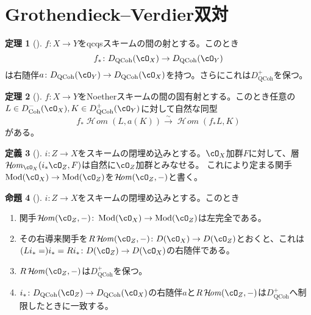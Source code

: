 \documentclass[uplatex, a4paper, dvipdfmx]{jsarticle}
\theoremstyle{definition}
\newtheorem{theorem}{定理}[section]
\newtheorem{definition}[theorem]{定義}
\newtheorem{proposition}[theorem]{命題}
\DeclareMathOperator{\CHom}{\mathcal{H}\!\mathit{om}}
\DeclareMathOperator{\Coh}{\mathrm{Coh}}
\DeclareMathOperator{\QCoh}{\mathrm{QCoh}}
\DeclareMathOperator{\Mod}{\mathrm{Mod}}
\begin{document}
\section{Grothendieck--Verdier双対}
\begin{theorem}[{\cite[\href{https://stacks.math.columbia.edu/tag/0A9E}{Tag 0A9E}]{stacks-project}}]
    $f \colon X \to Y$をqcqsスキームの間の射とする。このとき
    \begin{equation}
        f_* \colon D_{\QCoh}(\cO_X) \to D_{\QCoh}(\cO_Y)
    \end{equation}
    は右随伴$a \colon D_{\QCoh}(\cO_Y) \to D_{\QCoh}(\cO_X)$を持つ。さらにこれは$D_{\QCoh}^+$を保つ。
\end{theorem}
\begin{theorem}[{\cite[\href{https://stacks.math.columbia.edu/tag/0GEW}{Tag 0GEW}]{stacks-project}}]\label{thm:Grothendieck-Verdier-duality-for-complexes}
    $f \colon X \to Y$をNoetherスキームの間の固有射とする。このとき任意の$L \in D_{\Coh}^-(\cO_X), K \in D_{\QCoh}^+(\cO_Y)$に対して自然な同型
    \begin{equation}
        f_* \CHom(L, a(K)) \xrightarrow{\sim} \CHom(f_*L, K)
    \end{equation}
    がある。
\end{theorem}
\begin{definition}[{\cite[\href{https://stacks.math.columbia.edu/tag/0A74}{Tag 0A74}]{stacks-project}}]
    $i \colon Z \to X$をスキームの閉埋め込みとする。$\cO_X$加群$F$に対して、層$\CHom_{\cO_X}(i_*\cO_Z, F)$は自然に$\cO_Z$加群とみなせる。
    これにより定まる関手$\Mod(\cO_X) \to \Mod(\cO_Z)$を$\CHom(\cO_Z, -)$と書く。
\end{definition}
\begin{proposition}[{\cite[\href{https://stacks.math.columbia.edu/tag/0A74}{Tag 0A74}]{stacks-project}}]\label{prop:Grothendieck-Verdier-duality-for-closed-immersion}
    $i \colon Z \to X$をスキームの閉埋め込みとする。このとき
    \begin{enumerate}
        \item 関手$\CHom(\cO_Z, -) \colon \Mod(\cO_X) \to \Mod(\cO_Z)$は左完全である。
        \item その右導来関手を$R\CHom(\cO_Z, -) \colon D(\cO_X) \to D(\cO_Z)$とおくと、これは$(L i_* = )i_* = R i_* \colon D(\cO_Z) \to D(\cO_X)$の右随伴である。
        \item $R\CHom(\cO_Z, -)$は$D_{\QCoh}^+$を保つ。
        \item $i_* \colon D_{\QCoh}(\cO_Z) \to D_{\QCoh}(\cO_X)$の右随伴$a$と$R\CHom(\cO_Z, -)$は$D_{\QCoh}^+$へ制限したときに一致する。
    \end{enumerate}
\end{proposition}
\end{document}
